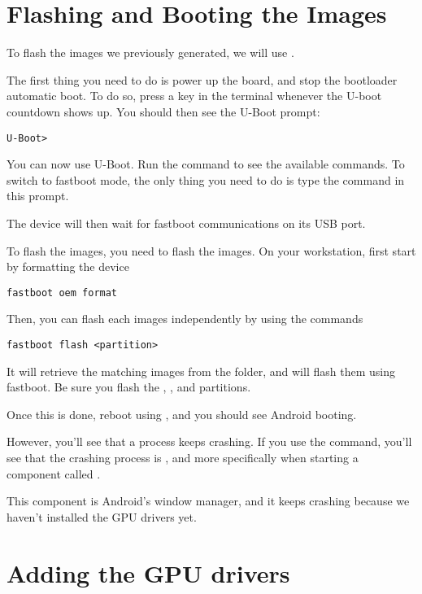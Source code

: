 \section{Flashing and Booting the Images}

To flash the images we previously generated, we will use
.

The first thing you need to do is power up the board, and stop the
bootloader automatic boot. To do so, press a key in the 
terminal whenever the U-boot countdown shows up. You should then see
the U-Boot prompt:
\begin{verbatim}
U-Boot>
\end{verbatim}

You can now use U-Boot. Run the  command to see the
available commands. To switch to fastboot mode, the only thing you
need to do is type the command  in this prompt.

The device will then wait for fastboot communications on its USB port.

To flash the images, you need to flash the images. On your
workstation, first start by formatting the device

\begin{verbatim}
fastboot oem format
\end{verbatim}

Then, you can flash each images independently by using the commands

\begin{verbatim}
fastboot flash <partition>
\end{verbatim}

It will retrieve the matching images from the  folder, and
will flash them using fastboot. Be sure you flash the ,
,  and  partitions.

Once this is done, reboot using , and you should
see Android booting.

However, you'll see that a process keeps crashing. If you use the
 command, you'll see that the crashing process is
, and more specifically when starting a component called
.

This component is Android's window manager, and it keeps crashing
because we haven't installed the GPU drivers yet.

\section{Adding the GPU drivers}

